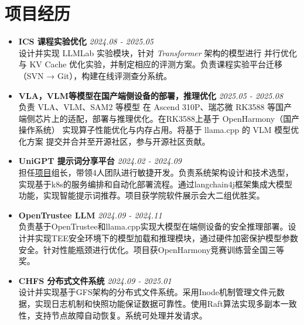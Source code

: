 \documentclass[a4paper]{article}
\begin{document}
\section*{项目经历}
\begin{itemize}[leftmargin=*,label={},itemsep=0.5em,topsep=0.2em]


\item \textbf{{ICS 课程实验优化}} \hfill \textit{2024.08 - 2025.05}\\
设计并实现 LLMLab 实验模块，针对 \textit{Transformer} 架构的模型进行 并行优化与 KV Cache 优化实验，并制定相应的评测方案。负责课程实验平台迁移（SVN → Git），构建在线评测查分系统。
\item \textbf{VLA，VLM等模型在国产端侧设备的部署，推理优化} \hfill \textit{2025.05 - 2025.08}\\
负责 VLA、VLM、SAM2 等模型 在 Ascend 310P、瑞芯微 RK3588 等国产端侧芯片上的适配，部署与推理优化。在RK3588上基于 OpenHarmony（国产操作系统） 实现算子性能优化与内存占用。将基于 llama.cpp 的 VLM 模型优化方案 提交并合并至开源社区，参与开源社区贡献。
\item \textbf{{UniGPT 提示词分享平台}} \hfill \textit{2024.02 - 2024.09}\\
担任{\href{https://github.com/UniGPT-SJTU}{项目}}组长，带领4人团队进行敏捷开发。负责系统架构设计和技术选型，实现基于k8s的服务编排和自动化部署流程。通过langchain4j框架集成大模型功能，实现智能提示词推荐。项目获学院软件展示会大二组优胜奖。
\item \textbf{{OpenTrustee LLM}} \hfill \textit{2024.09 - 2024.11}\\
负责基于OpenTrustee和llama.cpp实现大模型在端侧设备的安全推理部署。设计并实现TEE安全环境下的模型加载和推理模块，通过硬件加密保护模型参数安全。针对性能瓶颈进行优化。项目获OpenHarmony竞赛训练营全国三等奖。
\item \textbf{{CHFS 分布式文件系统}} \hfill \textit{2024.09 - 2025.01}\\
设计并实现基于GFS架构的分布式文件系统。采用Inode机制管理文件元数据，实现日志机制和快照功能保证数据可靠性。使用Raft算法实现多副本一致性，支持节点故障自动恢复。系统可处理并发请求。


\end{itemize}
\end{document}
